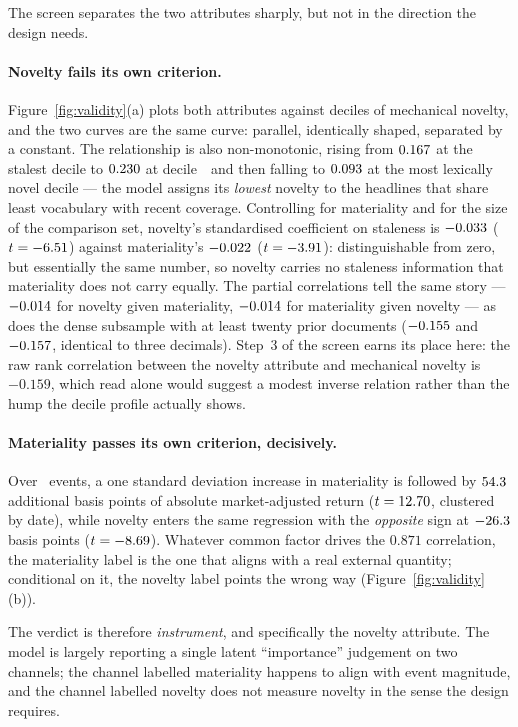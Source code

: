 \documentclass[preprint,12pt,authoryear]{elsarticle}
\theoremstyle{plain}
\theoremstyle{remark}
\begin{document}
The screen separates the two attributes sharply, but not in the direction the
design needs.

\paragraph{Novelty fails its own criterion.} Figure~\ref{fig:validity}(a) plots
both attributes against deciles of mechanical novelty, and the two curves are the
same curve: parallel, identically shaped, separated by a constant. The
relationship is also non-monotonic, rising from $0.167$ at the stalest
decile to $0.230$ at decile~\NuPeakDecile\ and then falling to
$0.093$ at the most lexically novel decile --- the model assigns its
\emph{lowest} novelty to the headlines that share least vocabulary with recent
coverage. Controlling for materiality and for the size of the comparison set,
novelty's standardised coefficient on staleness is $-0.033$
($t=-6.51$) against materiality's $-0.022$ ($t=-3.91$):
distinguishable from zero, but essentially the same number, so novelty carries no
staleness information that materiality does not carry equally. The partial
correlations tell the same story --- $-0.014$ for novelty given
materiality, $-0.014$ for materiality given novelty --- as does the
dense subsample with at least twenty prior documents ($-0.155$ and
$-0.157$, identical to three decimals). Step~3 of the screen earns its
place here: the raw rank correlation between the novelty attribute and mechanical
novelty is $-0.159$, which read alone would suggest a modest inverse relation
rather than the hump the decile profile actually shows.

\paragraph{Materiality passes its own criterion, decisively.} Over \AbsRetN\
events, a one standard deviation increase in materiality is followed by
$54.3$ additional basis points of absolute market-adjusted return
($t=12.70$, clustered by date), while novelty enters the same regression
with the \emph{opposite} sign at $-26.3$ basis points ($t=-8.69$).
Whatever common factor drives the $0.871$ correlation, the materiality label is
the one that aligns with a real external quantity; conditional on it, the novelty
label points the wrong way (Figure~\ref{fig:validity}(b)).

The verdict is therefore \emph{instrument}, and specifically the novelty
attribute. The model is largely reporting a single latent ``importance''
judgement on two channels; the channel labelled materiality happens to align
with event magnitude, and the channel labelled novelty does not measure novelty
in the sense the design requires.
\end{document}
